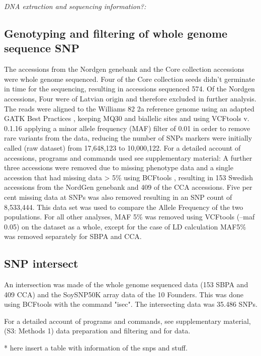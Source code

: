 \documentclass[9pt, twocolumn,twoside]{gsajnl}
\begin{document}
\textit{DNA extraction and sequencing information?:}

\subsection{Genotyping and filtering of whole genome sequence SNP}
The accessions from the Nordgen genebank and the Core collection accessions were whole genome sequenced. Four of the Core collection seeds didn't germinate in time for the sequencing, resulting in accessions sequenced 574. Of the Nordgen accessions, Four were of Latvian origin and therefore excluded in further analysis. 
The reads were aligned to the Williams 82 2a reference genome \cite{schmutz10} using an adapted GATK Best Practices \cite{mckenna10}, keeping MQ30 and biallelic sites and using VCFtools v. 0.1.16 \cite{danecek11} applying a minor allele frequency (MAF) filter of 0.01 in order to remove rare variants from the data, reducing the number of SNPs markers were initially called (raw dataset) from 17,648,123 to 10,000,122. 
For a detailed account of accessions, programs and commands used see supplementary material:  
A further three accessions were removed due to missing phenotype data and a single accession that had missing data > 5$\%$ using BCFtools \cite{danecek21}, resulting in 153 Swedish accessions from the NordGen genebank and 409 of the CCA accessions. Five per cent missing data at SNPs was also removed resulting in an SNP count of 8,533,444. This data set was used to compare the Allele Frequency of the two populations. For all other analyses, MAF 5\%  was removed using VCFtools (--maf 0.05) on the dataset as a whole, except for the case of LD calculation MAF5\% was removed separately for SBPA and CCA.  

\subsection{SNP intersect }
An intersection was made of the whole genome sequenced data (153 SBPA and 409 CCA) and the SoySNP50K array data of the 10 Founders.  This was done using BCFtools with the command "isec". The intersecting data was 35.486 SNPs. 

For a detailed account of programs and commands, see supplementary material,  (S3: Methods 1) data preparation and filtering and  for data. 

* here insert a table with information of the snps and stuff.
\end{document}
